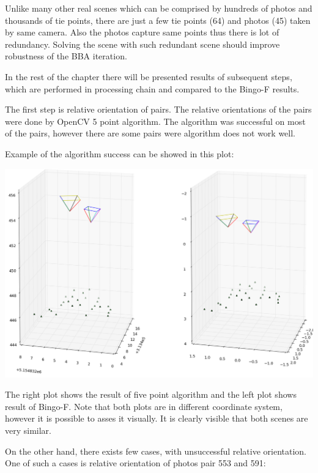 \documentclass[a4paper,12pt]{article}
\begin{document}
Unlike many other real scenes which can be comprised by hundreds of photos and thousands of tie points,   
there are just a few tie points (64) and photos (45) taken by same camera. Also the photos capture same points thus there 
is lot of redundancy. Solving the scene with such redundant scene should improve robustness of the BBA iteration. 

In the rest of the chapter there will be presented results of subsequent steps, which are performed in processing chain and compared 
to the Bingo-F results.

The first step is relative orientation of pairs. The relative orientations of the pairs were done by OpenCV 5 point algorithm.
The algorithm was successful on most of the pairs, however there are some pairs were algorithm does not work well.

Example of the algorithm success can be showed in this plot:

\includegraphics[scale=0.4]{figures/rel_or_576_598.png}

The right plot shows the result of five point algorithm and the left plot shows result of Bingo-F. Note that both 
plots are in different coordinate system, however it is possible to asses it visually. It is clearly visible
that both scenes are very similar.

On the other hand, there exists  few cases, with unsuccessful relative orientation.  
One of such a cases is relative orientation of photos pair 553 and 591:  
\end{document}
